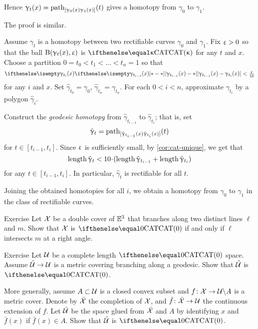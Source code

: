 Hence $\upgamma_t(x)=\mathrm{path}_{[\upgamma_0(x)\upgamma_1(x)]}(t)$ gives a homotopy from $\gamma_0$ to $\gamma_1$.

 The proof is similar.

Assume $\gamma_t$ is a homotopy between two rectifiable curves $\gamma_0$ and $\gamma_1$.
Fix $\upvarepsilon>0$ so that the ball $\mathrm{B}{}(\upgamma_t(x),\upvarepsilon)$ is $\CAT\kappa$
for any $t$ and $x$.
Choose a partition $0=t_0<t_1<\dots<t_n=1$ 
so that 
$$\dist{\gamma_{t_{i-1}}(x)}{\gamma_{t_i}(x)}{}<\tfrac\eps{10}$$
for any $i$ and $x$.
Set $\hat\gamma_{t_0}=\gamma_0$, $\hat\gamma_{t_n}=\gamma_{t_n}$.
For each $0<i<n$, approximate $\gamma_{t_i}$ by a polygon $\hat\gamma_{i}$.

Construct the \emph{geodesic homotopy} 
from $\hat\gamma_{t_{i-1}}$ 
to $\hat\gamma_{t_i}$;  
that is,
set 
$$\hat{\upgamma}_t
=
\mathrm{path}_{[\hat{\upgamma}_{t_{i-1}}(x)\hat{\upgamma}_{t_i}(x)]}(t)$$
for $t\in [t_{i-1},t_i]$.
Since $\upvarepsilon$ is sufficiently small, 
by \ref{cor:cat-unique}, we get that
$$\length\hat\gamma_t
<
10\cdot(\length\hat\gamma_{t_{i-1}}+\length\hat\gamma_{t_i})$$
for any $t\in [t_{i-1},t_i]$.
In particular, $\hat\gamma_t$ is rectifiable for all $t$.

Joining the obtained homotopies for all $i$, we obtain a homotopy from $\gamma_0$ to $\gamma_1$ in the class of rectifiable curves.
\qeds

\begin{thm}{Exercise}\label{ex:cover-branching-along-2-lines}
Let $\mathcal{X}$ be a double cover of $\mathbb{E}^3$ that branches along two distinct lines $\ell$ and $m$.
Show that  $\mathcal{X}$ is $\CAT0$ if and only if $\ell$ intersects $m$ at a right angle.
\end{thm}

\begin{thm}{Exercise}\label{ex:branching}
Let $\mathcal{U}$ be a complete length $\CAT0$ space.
Assume $\tilde{\spc{U}}\to \spc{U}$ is a metric covering branching along a geodesic.
Show that $\tilde{\mathcal{U}}$ is $\CAT0$.

More generally, assume $A\subset \spc{U}$ is a closed convex subset and $f\:\spc{X}\to \spc{U}\backslash A$ is a metric cover.
Denote by $\bar{\mathcal{X}}$ the completion of $\mathcal{X}$, and 
$\bar f\:\bar{\spc{X}}\to \spc{U}$ the continuous extension of $f$.
Let $\tilde{\mathcal{U}}$ be the space glued from $\bar{\mathcal{X}}$ and $A$ by identifying $x$ and $\bar f(x)$ if $\bar f(x)\in A$.
Show that $\tilde{\mathcal{U}}$ is $\CAT0$.
\end{thm}

